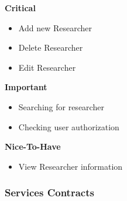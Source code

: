 \documentclass{article}
\begin{document}
		\begin{flushleft}
			\textbf{Critical}
				\begin{itemize}
	  				\item Add new Researcher
	  				\item Delete Researcher
	  				\item Edit Researcher
				\end{itemize}

			\textbf{Important}
				\begin{itemize}
	  				\item Searching for researcher
	  				\item Checking user authorization
				\end{itemize}

			\textbf{Nice-To-Have}
				\begin{itemize}
	  				\item View Researcher information
				\end{itemize}
		\end{flushleft}

	\subsubsection{Services Contracts}
\end{document}
